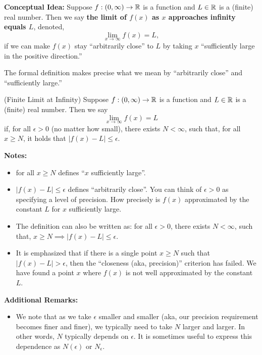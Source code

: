 \begin{tcolorbox}[colback=mylightblue, title = {\bf Finite Limits at $\infty$}, breakable]

\textbf{Conceptual Idea:} Suppose $f:(0,\infty) \to \mathbb R$ is a function and $L\in \mathbb R$ is a (finite) real number. Then we say \textbf{the limit of $f(x)$ as $x$ approaches infinity equals $L$}, denoted, 
$$ \lim_{x \to \infty} f(x) = L,$$
if we can make $f(x)$ stay ``arbitrarily close'' to $L$ by taking $x$ ``sufficiently large in the positive direction.'' 

\bigskip

The formal definition makes precise what we mean by ``arbitrarily close'' and ``sufficiently large.'' 

\begin{definition}
\label{def:LimitAtInfinity}
(Finite Limit at Infinity) Suppose $f:(0,\infty) \to \mathbb R$ is a function and $L\in \mathbb R$ is a (finite) real number. Then we say 
$$ \lim_{x \to \infty} f(x) = L$$ 
if, for all $\epsilon >0$ (no matter how small), there exists $N < \infty$, such that, for all $x \ge N$, it holds that $|f(x) - L| \le \epsilon$.\\
\end{definition}

\textbf{Notes:}
\begin{itemize}
    \item for all $x \ge N$ defines ``$x$ sufficiently large''.
    \item $|f(x) - L| \le \epsilon$  defines ``arbitrarily close''. You can think of $\epsilon >0$ as specifying a level of precision. How precisely is $f(x)$ approximated by the constant $L$ for $x$ sufficiently large.
    \item The definition can also be written as: for all $\epsilon >0$, there exists $N < \infty$, such that, $x \ge N \implies |f(x) - L| \le \epsilon$.
    \item It is emphasized that if there is a single point $x \ge N$ such that $|f(x) - L| > \epsilon$, then the ``closeness (aka, precision)'' criterion has failed. We have found a point $x$ where $f(x)$ is not well approximated by the constant $L$. \\
\end{itemize}
 


\textbf{Additional Remarks:}
\begin{itemize}
    \item We note that as we take $\epsilon$ smaller and smaller (aka, our precision requirement becomes finer and finer), we typically need to take $N$ larger and larger. In other words, $N$ typically depends on $\epsilon$. It is sometimes useful to express this dependence as $N(\epsilon)$ or $N_\epsilon$. 


\end{itemize}
\end{tcolorbox}
